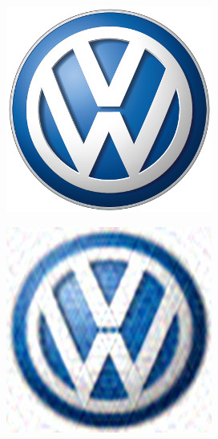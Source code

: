 \begin{figure}[h!]
  \centering
  \begin{subfigure}[b]{0.20\textwidth}
    \centering
    \includegraphics[width=\textwidth]{plaatjes/vw.jpg}
  \end{subfigure}
  \begin{subfigure}[b]{0.20\textwidth}
    \centering
    \includegraphics[width=\textwidth]{plaatjes/vw_fourier_0_01.jpg}

\end{subfigure}
\end{figure}
